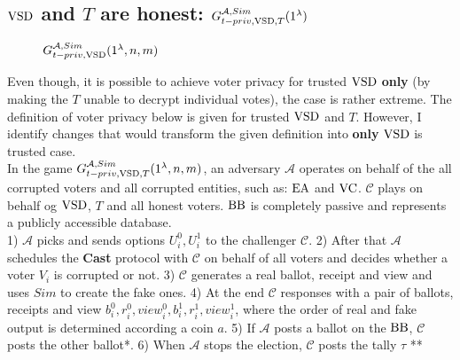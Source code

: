 \subsection{$\operatorname{VSD}$ and $T$ are honest: $G_{t-priv,\operatorname{VSD},T}^{\mathcal{A},Sim}(1^{\lambda})$}
     \begin{figure}[h!]
 
        \caption{ $G_{t-priv,\operatorname{VSD}}^{\mathcal{A},Sim}(1^{\lambda},n,m)$}
\end{figure}
Even though, it is possible to achieve voter privacy for trusted $\operatorname{VSD}$ \textbf{only}  (by making the $T$ unable to decrypt individual votes), the case is rather extreme. The definition of voter privacy below is given for trusted $\operatorname{VSD}$ and $T$. However, I identify changes that would transform the given definition into \textbf{only} $\operatorname{VSD}$ is trusted case.\\

 In the game $G_{t-priv,\operatorname{VSD},T}^{\mathcal{A}, Sim}(1^{\lambda},n,m)$, an adversary $\mathcal{A}$  operates on behalf of the all corrupted voters and all corrupted entities, such as:  $\operatorname{EA}$ and $\operatorname{VC}$.  $\mathcal{C}$ plays on behalf og $\operatorname{VSD}$, $T$ and all honest voters. $\operatorname{BB}$ is completely passive and represents a publicly accessible database.\\
 
 1)  $\mathcal{A}$ picks and sends options $U_i^0, U_i^1$ to the challenger $\mathcal{C}$. 2) After that $\mathcal{A}$ schedules the \textbf{Cast} protocol with $\mathcal{C}$ on behalf of all voters and decides whether a voter $V_i$ is corrupted or not. 3) $\mathcal{C}$ generates a real ballot, receipt and view and uses $Sim$ to create the fake ones.  4) At the end $\mathcal{C}$ responses with a pair of ballots, receipts and view $b_i^0,r_i^0,view_i^0,b_i^1,r_i^1,view_i^1$, where the order of real and fake output is determined according a coin $a$. 5) If $\mathcal{A}$ posts a ballot on the $\operatorname{BB}$, $\mathcal{C}$ posts the other ballot*. 6)  When $\mathcal{A}$ stops the election, $\mathcal{C}$ posts the tally $\tau$ ** \\

